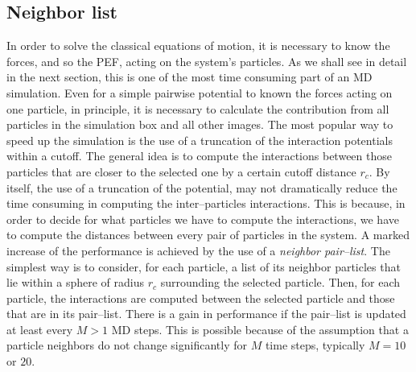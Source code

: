 \subsection{Neighbor list}
\label{sec:neighbor}
In order to solve the classical equations of motion, it is necessary to know the forces, and so the \ac{PEF}, acting on the system's particles. As we shall see in detail in the next section, this is one of the most time consuming part of an \ac{MD} simulation. Even for a simple pairwise potential to known the forces acting on one particle, in principle, it is necessary to calculate the contribution from all particles in the simulation box and all other images. The most popular way to speed up the simulation is the use of a truncation of the interaction potentials within a cutoff. The general idea is to compute the interactions between those particles that are closer to the selected one by a certain cutoff distance $r_c$. By itself, the use of a truncation of the potential, may not dramatically reduce the time consuming in computing the inter--particles interactions.
This is because, in order to decide for what particles we have to compute the interactions, we have to compute the distances between every pair of particles in the system. A marked increase of the performance is achieved by the use of a \textit{neighbor pair--list}. The simplest way is to consider, for each particle, a list of its neighbor particles that lie within a sphere of radius $r_c$ surrounding the selected particle. Then, for each particle, the interactions are computed between the selected particle and those that are in its pair--list. There is a gain in performance if the pair--list is updated at least every $M>1$ \ac{MD} steps. This is possible because of the assumption that a particle neighbors do not change significantly for $M$ time steps, typically $M=10$ or $20$.

